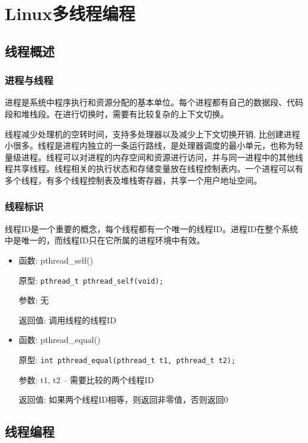 \documentclass[12pt, a4paper, oneside]{ctexbook}
\numberwithin{figure}{section}
\begin{document}
\section{Linux多线程编程}

\subsection{线程概述}

\subsubsection{进程与线程}
进程是系统中程序执行和资源分配的基本单位。每个进程都有自己的数据段、代码段和堆栈段。在进行切换时，需要有比较复杂的上下文切换。

线程减少处理机的空转时间，支持多处理器以及减少上下文切换开销, 比创建进程小很多。线程是进程内独立的一条运行路线，是处理器调度的最小单元，也称为轻量级进程。线程可以对进程的内存空间和资源进行访问，并与同一进程中的其他线程共享线程。线程相关的执行状态和存储变量放在线程控制表内。一个进程可以有多个线程，有多个线程控制表及堆栈寄存器，共享一个用户地址空间。

\subsubsection{线程标识}
线程ID是一个重要的概念，每个线程都有一个唯一的线程ID。进程ID在整个系统中是唯一的，而线程ID只在它所属的进程环境中有效。

\begin{itemize}
    \item 函数: pthread\_self() 

    原型: \texttt{pthread\_t pthread\_self(void);} 

    参数: 无

    返回值: 调用线程的线程ID

    \item 函数: pthread\_equal() 

    原型: \texttt{int pthread\_equal(pthread\_t t1, pthread\_t t2);} 

    参数: t1, t2 -- 需要比较的两个线程ID

    返回值: 如果两个线程ID相等，则返回非零值，否则返回0
\end{itemize}

\subsection{线程编程}
\end{document}

